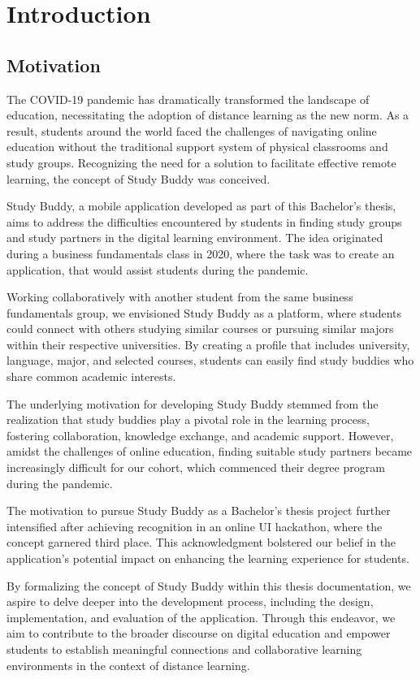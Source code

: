 \chapter{Introduction}
\label{ch:intro}

\section{Motivation}
The COVID-19 pandemic has dramatically transformed the landscape of education, necessitating the adoption of distance learning as the new norm. As a result, students around the world faced the challenges of navigating online education without the traditional support system of physical classrooms and study groups. Recognizing the need for a solution to facilitate effective remote learning, the concept of Study Buddy was conceived.

Study Buddy, a mobile application developed as part of this Bachelor's thesis, aims to address the difficulties encountered by students in finding study groups and study partners in the digital learning environment. The idea originated during a business fundamentals class in 2020, where the task was to create an application, that would assist students during the pandemic.

Working collaboratively with another student from the same business fundamentals group, we envisioned Study Buddy as a platform, where students could connect with others studying similar courses or pursuing similar majors within their respective universities. By creating a profile that includes university, language, major, and selected courses, students can easily find study buddies who share common academic interests.

The underlying motivation for developing Study Buddy stemmed from the realization that study buddies play a pivotal role in the learning process, fostering collaboration, knowledge exchange, and academic support. However, amidst the challenges of online education, finding suitable study partners became increasingly difficult for our cohort, which commenced their degree program during the pandemic.

The motivation to pursue Study Buddy as a Bachelor's thesis project further intensified after achieving recognition in an online UI hackathon, where the concept garnered third place. This acknowledgment bolstered our belief in the application's potential impact on enhancing the learning experience for students.

By formalizing the concept of Study Buddy within this thesis documentation, we aspire to delve deeper into the development process, including the design, implementation, and evaluation of the application. Through this endeavor, we aim to contribute to the broader discourse on digital education and empower students to establish meaningful connections and collaborative learning environments in the context of distance learning.

